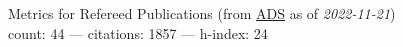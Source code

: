 Metrics for Refereed Publications (from \href{\adsurl}{ADS} as of \textit{2022-11-21}) \\count: 44 --- citations: 1857 --- h-index: 24